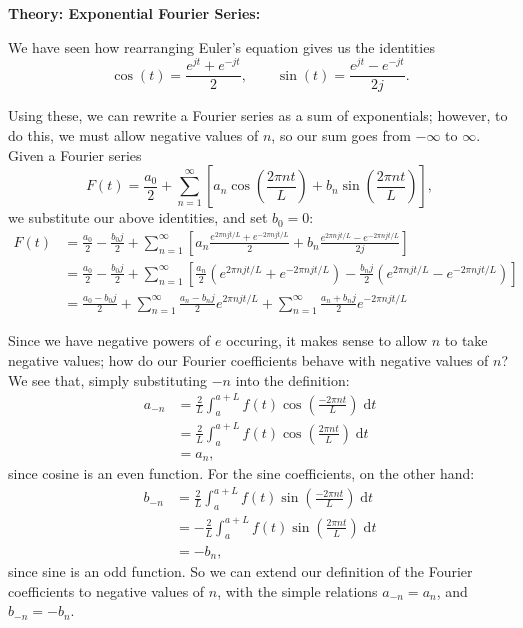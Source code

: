 \documentclass{article}
\newcommand{\diff}{\;\mathrm{d}}
\begin{document}
\textbf{Theory: Exponential Fourier Series:}

\bigskip


We have seen how rearranging Euler's equation gives us the identities
\[\cos(t)=\frac{e^{jt}+e^{-jt}}{2},\qquad \sin(t)=\frac{e^{jt}-e^{-jt}}{2j}.\]

Using these, we can rewrite a Fourier series as a sum of exponentials; however, to do this, we must allow negative values of $n$, so our sum goes from $-\infty$ to $\infty$. Given a Fourier series
\[F(t)=\frac{a_0}{2}+\sum_{n=1}^\infty \left[a_n\cos\left(\frac{2\pi nt}{L}\right) + b_n\sin\left(\frac{2\pi nt}{L}\right)\right],\]
we substitute our above identities, and set $b_0=0$:
\begin{align*}
	F(t) &= \frac{a_0}{2} - \frac{b_0j}{2} + \sum_{n=1}^\infty \left[a_n\frac{e^{2\pi njt/L}+e^{-2\pi njt/L}}{2} + b_n\frac{e^{2\pi njt/L}-e^{-2\pi njt/L}}{2j}\right]\\
	&= \frac{a_0}{2} -\frac{b_0j}{2}+ \sum_{n=1}^\infty \left[\frac{a_n}{2}\left(e^{2\pi njt/L}+e^{-2\pi njt/L}\right) - \frac{b_nj}{2}\left(e^{2\pi njt/L}-e^{-2\pi njt/L}\right)\right]\\
	&= \frac{a_0-b_0j}{2} + \sum_{n=1}^\infty \frac{a_n-b_nj}{2}e^{2\pi njt/L} + \sum_{n=1}^\infty \frac{a_n+b_nj}{2}e^{-2\pi njt/L}
\end{align*}

Since we have negative powers of $e$ occuring, it makes sense to allow $n$ to take negative values; how do our Fourier coefficients behave with negative values of $n$? We see that, simply substituting $-n$ into the definition:
\begin{align*}
	a_{-n} &= \frac{2}{L}\int_a^{a+L} f(t)\cos\left(\frac{-2\pi nt}{L}\right)\diff t\\
	&=\frac{2}{L}\int_a^{a+L} f(t)\cos\left(\frac{2\pi nt}{L}\right)\diff t\\
	&=a_n,
\end{align*}
since cosine is an even function. For the sine coefficients, on the other hand:
\begin{align*}
	b_{-n} &= \frac{2}{L}\int_a^{a+L} f(t)\sin\left(\frac{-2\pi nt}{L}\right)\diff t\\
	&= -\frac{2}{L}\int_a^{a+L} f(t)\sin\left(\frac{2\pi nt}{L}\right)\diff t\\
	&=-b_n,
\end{align*}
since sine is an odd function. So we can extend our definition of the Fourier coefficients to negative values of $n$, with the simple relations $a_{-n}=a_n$, and $b_{-n}=-b_n$.
\end{document}
